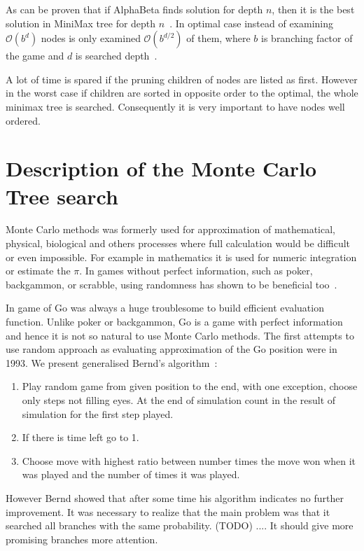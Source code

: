 As can be proven that if AlphaBeta finds solution for depth $n$, then it is the
best solution in MiniMax tree for depth $n$~\cite{knuth:alphabeta}. In optimal
case instead of examining $\mathcal O(b^d)$ nodes is only examined $\mathcal
O(b^{d/2})$ of them, where $b$ is branching factor of the game and $d$ is
searched depth~\cite{ZHONG}.

A lot of time is spared if the pruning children of nodes are listed as first.
However in the worst case if children are sorted in opposite order to the
optimal, the whole minimax tree is searched. Consequently it is very important
to have nodes well ordered.


\section{Description of the Monte Carlo Tree search}
Monte Carlo methods was formerly used for approximation of mathematical,
physical, biological and others processes where full calculation would be
difficult or even impossible. For example in mathematics it is used for numeric
integration or estimate the $\pi$. In games without perfect information, such
as poker, backgammon, or scrabble, using randomness has shown to be beneficial
too~\cite{MonteCarloMethod, MonteCarloGo}.

In game of Go was always a huge troublesome to build efficient evaluation
function. Unlike poker or backgammon, Go is a game with perfect information and
hence it is not so natural to use Monte Carlo methods. The first attempts to
use random approach as evaluating approximation of the Go position were in
1993. We present generalised Bernd's algorithm~\cite{BERND,KOZELEK}:

\begin{enumerate}
\item Play random game from given position to the end, with one exception,
	choose only steps not filling eyes. At the end of simulation count in the
	result of simulation for the first step played.
\item If there is time left go to 1.
\item Choose move with highest ratio between number times the move won when it
	  was played and the number of times it was played.
\end{enumerate}

However Bernd showed that after some time his algorithm indicates no further
improvement. It was necessary to realize that the main problem was that it
searched all branches with the same probability. (TODO) .... It should give more
promising branches more attention.


